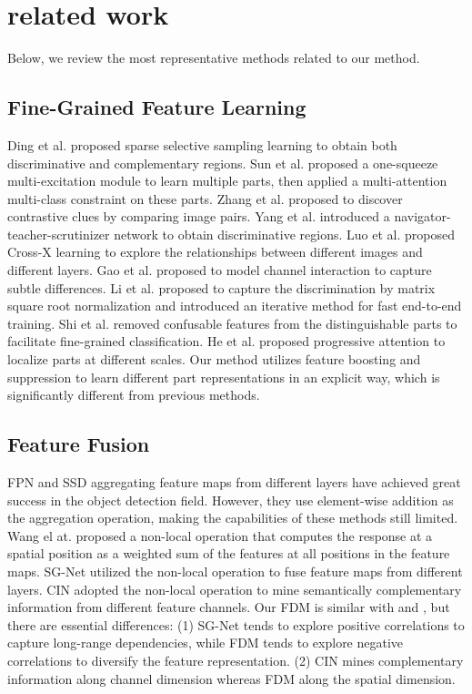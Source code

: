 \documentclass[conference]{IEEEtran}
\begin{document}
	\section{related work}
	Below, we review the most representative methods related to our method.
	\subsection{Fine-Grained Feature Learning}
	Ding et al.\cite{S3N} proposed sparse selective sampling learning to obtain both discriminative and complementary regions. Sun et al.\cite{MAMC} proposed a one-squeeze multi-excitation module to learn multiple parts, then applied a multi-attention multi-class constraint on these parts. Zhang et al.\cite{API-NET} proposed to discover contrastive clues by comparing image pairs. Yang et al.\cite{NTS} introduced a navigator-teacher-scrutinizer
	network to obtain discriminative regions. Luo et al.\cite{CrossX} proposed Cross-X learning to explore the relationships between different images and different layers. Gao et al.\cite{CIN} proposed to model channel interaction to capture subtle differences. Li et al.\cite{iSQRT-COV} proposed to capture the discrimination by matrix square root normalization and introduced an iterative method for fast end-to-end training. 
	Shi et al. \cite{Beyond-att} removed confusable features from the distinguishable parts to facilitate fine-grained classification. He et al. \cite{Progressive-Att} proposed progressive attention to localize parts at different scales.
	Our method utilizes feature boosting and suppression to learn different part representations in an explicit way, which is significantly different from previous methods. 
	\subsection{Feature Fusion}
	FPN\cite{FPN} and SSD\cite{SSD} aggregating feature maps from different layers have achieved great success in the object detection field. However, they use element-wise addition as the aggregation operation, making the capabilities of these methods still limited.  Wang el at.\cite{Non-Local} proposed a non-local operation that computes the response at a spatial position as a weighted sum of the features at all positions in the feature maps. SG-Net\cite{SG-Net} utilized the non-local operation to fuse feature maps from different layers. CIN \cite{CIN} adopted the non-local operation to mine semantically complementary information from different feature channels. 
	Our FDM is similar with \cite{SG-Net} and \cite{CIN}, but there are essential differences: (1) SG-Net tends to explore positive correlations to capture long-range dependencies, while FDM tends to explore negative correlations to diversify the feature representation. (2) CIN mines complementary information along channel dimension
	whereas FDM along the spatial dimension.
	
\end{document}
